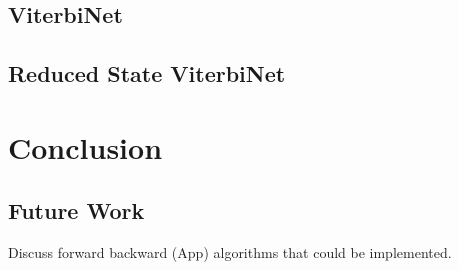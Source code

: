 \documentclass[12pt,a4paper]{article}
\begin{document}
\subsection*{ViterbiNet}
\subsection*{Reduced State ViterbiNet}
\section{Conclusion}
\subsection{Future Work}
Discuss forward backward (App) algorithms that could be implemented.

\newpage

\end{document}
